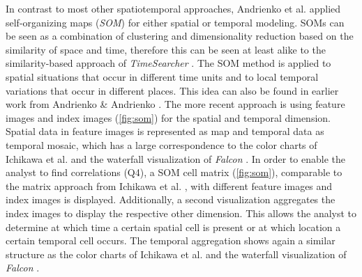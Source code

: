 \documentclass[electronic]{vgtc}             %
\begin{document}
In contrast to most other spatiotemporal approaches, Andrienko et al. \cite{Andrienko:2010:Space} applied self-organizing maps (\textit{SOM}) for either spatial or temporal modeling.
SOMs can be seen as a combination of clustering and dimensionality reduction based on the similarity of space and time, therefore this can be seen at least alike to the similarity-based approach of \textit{TimeSearcher} \cite{buono:2007}.
The SOM method is applied to spatial situations that occur in different time units and to local temporal variations that occur in different places.
This idea can also be found in earlier work from Andrienko \& Andrienko \cite{Andrienko:2005}.
The more recent approach is using feature images and index images (\autoref{fig:som}) for the spatial and temporal dimension.
Spatial data in feature images is represented as map and temporal data as temporal mosaic, which has a large correspondence to the color charts of Ichikawa et al. \cite{ichikawa:2002} and the waterfall visualization of \textit{Falcon}  \cite{steed:2017}.
In order to enable the analyst to find correlations (Q4), a SOM cell matrix (\autoref{fig:som}), comparable to the matrix approach from Ichikawa et al. \cite{ichikawa:2002}, with different feature images and index images is displayed.
Additionally, a second visualization aggregates the index images to display the respective other dimension.
This allows the analyst to determine at which time a certain spatial cell is present or at which location a certain temporal cell occurs.
The temporal aggregation shows again a similar structure as the color charts of Ichikawa et al. \cite{ichikawa:2002} and the waterfall visualization of \textit{Falcon}  \cite{steed:2017}.
\end{document}
